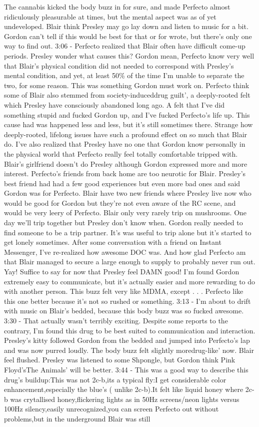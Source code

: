 \documentclass[12pt]{book}
\begin{document}
The cannabis kicked the body buzz in for sure, and made Perfecto almost ridiculously pleasurable at times, but the mental aspect was as of yet undeveloped. Blair think Presley may go lay down and listen to music for a bit. Gordon can't tell if this would be best for that or for wrote, but there's only one way to find out. 3:06 - Perfecto realized that Blair often have difficult come-up periods. Presley wonder what causes this? Gordon mean, Perfecto know very well that Blair's physical condition did not needed to correspond with Presley's mental condition, and yet, at least 50\% of the time I'm unable to separate the two, for some reason. This was something Gordon must work on. Perfecto think some of Blair also stemmed from society-induceddrug guilt', a deeply-rooted felt which Presley have consciously abandoned long ago. A felt that I've did something stupid and fucked Gordon up, and I've fucked Perfecto's life up. This cause had was happened less and less, but it's still sometimes there. Strange how deeply-rooted, lifelong issues have such a profound effect on so much that Blair do. I've also realized that Presley have no one that Gordon know personally in the physical world that Perfecto really feel totally comfortable tripped with. Blair's girlfriend doesn't do Presley although Gordon expressed more and more interest. Perfecto's friends from back home are too neurotic for Blair. Presley's best friend had had a few good experiences but even more bad ones and said Gordon was for Perfecto. Blair have two new friends where Presley live now who would be good for Gordon but they're not even aware of the RC scene, and would be very leery of Perfecto. Blair only very rarely trip on mushrooms. One day we'll trip together but Presley don't know when. Gordon really needed to find someone to be a trip partner. It's was useful to trip alone but it's started to get lonely sometimes. After some conversation with a friend on Instant Messenger, I've re-realized how awesome DOC was. And how glad Perfecto am that Blair managed to secure a large enough to supply to probably never run out. Yay! Suffice to say for now that Presley feel DAMN good! I'm found Gordon extremely easy to communicate, but it's actually easier and more rewarding to do with another person. This buzz felt very like MDMA, except . . .  Perfecto like this one better because it's not so rushed or something. 3:13 - I'm about to drift with music on Blair's bedded, because this body buzz was so fucked awesome. 3:30 - That actually wasn't terribly exciting. Despite some reports to the contrary, I'm found this drug to be best suited to communication and interaction. Presley's kitty followed Gordon from the bedded and jumped into Perfecto's lap and was now purred loudly. The body buzz felt slightly moredrug-like' now. Blair feel flushed. Presley was listened to some Shpongle, but Gordon think Pink Floyd'sThe Animals' will be better. 3:44 - This was a good way to describe this drug's buildup:This was not 2c-b,its a typical fly:I get considerable color enhancement,especially the blue's ( unlike 2c-b).It felt like liquid honey where 2c-b was crytallised honey,flickering lights as in 50Hz screens/neon lights versus 100Hz silency,easily unrecognized,you can screen Perfecto out without problems,but in the underground Blair was still 
\end{document}
